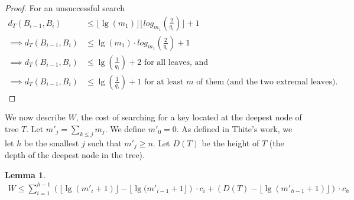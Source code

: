 \documentclass[letterpaper,12pt,titlepage,oneside,final]{book}
\theoremstyle{plain}
\newtheorem{lem}[thm]{Lemma}
\begin{document}
\begin{proof}
\noindent For an unsuccessful search
\begin{align*}
d_T(B_{i-1},B_i) &\leq \lfloor \lg(m_1) \rfloor \lfloor log_{m_1}(\frac{2}{q_i}) \rfloor + 1 \\
\implies d_T(B_{i-1},B_i) &\leq \lg(m_1)\cdot log_{m_1}(\frac{2}{q_i}) + 1 \\
\implies d_T(B_{i-1},B_i) &\leq \lg(\frac{1}{q_i}) + 2 \text{ for all leaves, and} \\
\implies d_T(B_{i-1},B_i) &\leq \lg(\frac{1}{q_i}) + 1 \text{ for at least $m$ of them (and the two extremal leaves)}.
\end{align*}


\end{proof}

We now describe $W$, the cost of searching for a key located at the deepest node of tree $T$. Let $m'_j = \sum_{k \leq j} m_j$. We define $m'_0 = 0$. As defined in Thite's work, we let $h$ be the smallest $j$ such that $m'_j \geq n$. Let $D(T)$ be the height of $T$ (the depth of the deepest node in the tree).


\begin{lem} \label{452}
\begin{align*}
W \leq \sum_{i=1}^{h-1} \left(\lfloor \lg(m'_i+1) \rfloor - \lfloor \lg(m'_{i-1}+1 \rfloor  \right)\cdot c_i+ \left(D(T) - \lfloor \lg(m'_{h-1}+1) \rfloor \right)\cdot c_h
\end{align*}
\end{lem}
\end{document}
